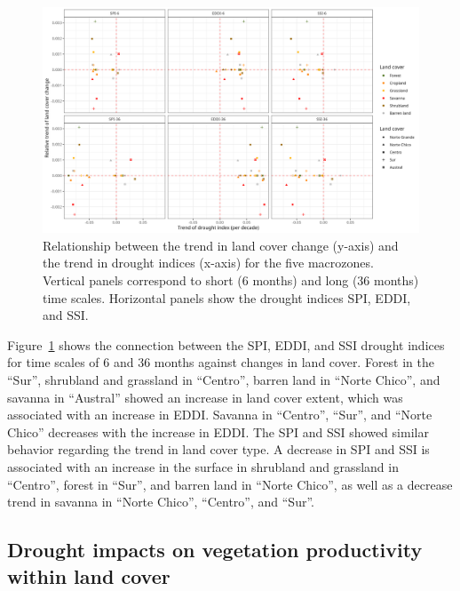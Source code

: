 \documentclass[
  authoryear,
  preprint,
  3p,
  onecolumn]{elsarticle}
\begin{document}
\begin{figure}[!ht]

{\centering \includegraphics{../output/figs/points_landcover_drought_indices_trend_and_time_scale.png}

}

\caption{\label{fig-TrendsLandDrought}Relationship between the trend in
land cover change (y-axis) and the trend in drought indices (x-axis) for
the five macrozones. Vertical panels correspond to short (6 months) and
long (36 months) time scales. Horizontal panels show the drought indices
SPI, EDDI, and SSI.}

\end{figure}

Figure~\ref{fig-TrendsLandDrought} shows the connection between the SPI,
EDDI, and SSI drought indices for time scales of 6 and 36 months against
changes in land cover. Forest in the ``Sur'', shrubland and grassland in
``Centro'', barren land in ``Norte Chico'', and savanna in ``Austral''
showed an increase in land cover extent, which was associated with an
increase in EDDI. Savanna in ``Centro'', ``Sur'', and ``Norte Chico''
decreases with the increase in EDDI. The SPI and SSI showed similar
behavior regarding the trend in land cover type. A decrease in SPI and
SSI is associated with an increase in the surface in shrubland and
grassland in ``Centro'', forest in ``Sur'', and barren land in ``Norte
Chico'', as well as a decrease trend in savanna in ``Norte Chico'',
``Centro'', and ``Sur''.

\hypertarget{drought-impacts-on-vegetation-productivity-within-land-cover}{%
\subsection{Drought impacts on vegetation productivity within land
cover}\label{drought-impacts-on-vegetation-productivity-within-land-cover}}
\end{document}
